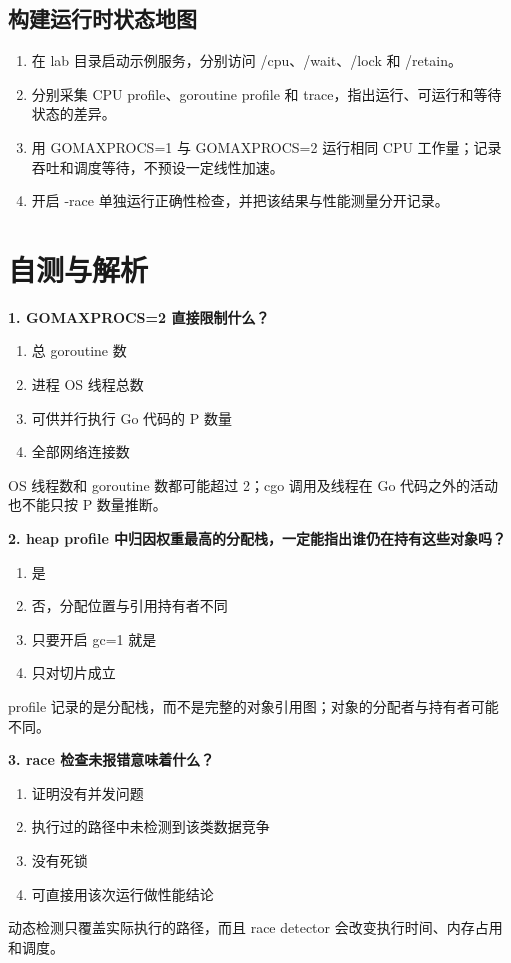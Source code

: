 \documentclass[UTF8,fontset=fandol,openany,11pt]{ctexbook}
\begin{document}
\subsection*{构建运行时状态地图}
\begin{enumerate}
\item 在 lab 目录启动示例服务，分别访问 /cpu、/wait、/lock 和 /retain。

\item 分别采集 CPU profile、goroutine profile 和 trace，指出运行、可运行和等待状态的差异。

\item 用 GOMAXPROCS=1 与 GOMAXPROCS=2 运行相同 CPU 工作量；记录吞吐和调度等待，不预设一定线性加速。

\item 开启 -race 单独运行正确性检查，并把该结果与性能测量分开记录。

\end{enumerate}
\section{自测与解析}
\noindent\textbf{1. GOMAXPROCS=2 直接限制什么？}
\begin{enumerate}[label=\Alph*.]
\item 总 goroutine 数
\item 进程 OS 线程总数
\item 可供并行执行 Go 代码的 P 数量
\item 全部网络连接数
\end{enumerate}
OS 线程数和 goroutine 数都可能超过 2；cgo 调用及线程在 Go 代码之外的活动也不能只按 P 数量推断。

\noindent\textbf{2. heap profile 中归因权重最高的分配栈，一定能指出谁仍在持有这些对象吗？}
\begin{enumerate}[label=\Alph*.]
\item 是
\item 否，分配位置与引用持有者不同
\item 只要开启 gc=1 就是
\item 只对切片成立
\end{enumerate}
profile 记录的是分配栈，而不是完整的对象引用图；对象的分配者与持有者可能不同。

\noindent\textbf{3. race 检查未报错意味着什么？}
\begin{enumerate}[label=\Alph*.]
\item 证明没有并发问题
\item 执行过的路径中未检测到该类数据竞争
\item 没有死锁
\item 可直接用该次运行做性能结论
\end{enumerate}
动态检测只覆盖实际执行的路径，而且 race detector 会改变执行时间、内存占用和调度。
\end{document}
